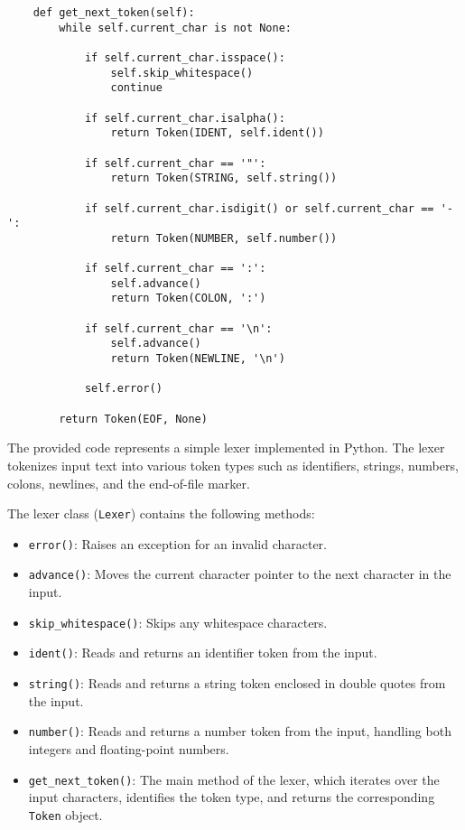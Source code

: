 \begin{lstlisting}
    def get_next_token(self):
        while self.current_char is not None:

            if self.current_char.isspace():
                self.skip_whitespace()
                continue

            if self.current_char.isalpha():
                return Token(IDENT, self.ident())

            if self.current_char == '"':
                return Token(STRING, self.string())

            if self.current_char.isdigit() or self.current_char == '-':
                return Token(NUMBER, self.number())

            if self.current_char == ':':
                self.advance()
                return Token(COLON, ':')

            if self.current_char == '\n':
                self.advance()
                return Token(NEWLINE, '\n')

            self.error()

        return Token(EOF, None)
\end{lstlisting}

The provided code represents a simple lexer implemented in Python. The lexer tokenizes input text into various token types such as identifiers, strings, numbers, colons, newlines, and the end-of-file marker.

The lexer class (\texttt{Lexer}) contains the following methods:

\begin{itemize}
    \item \texttt{error()}: Raises an exception for an invalid character.
    \item \texttt{advance()}: Moves the current character pointer to the next character in the input.
    \item \texttt{skip\_whitespace()}: Skips any whitespace characters.
    \item \texttt{ident()}: Reads and returns an identifier token from the input.
    \item \texttt{string()}: Reads and returns a string token enclosed in double quotes from the input.
    \item \texttt{number()}: Reads and returns a number token from the input, handling both integers and floating-point numbers.
    \item \texttt{get\_next\_token()}: The main method of the lexer, which iterates over the input characters, identifies the token type, and returns the corresponding \texttt{Token} object.
\end{itemize}

